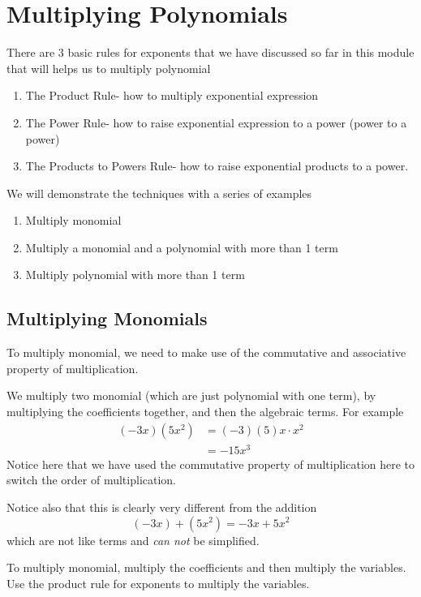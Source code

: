 \section{Multiplying Polynomials}
%
There are 3 basic rules for exponents that we have discussed so far in this module that will 
helps us to multiply polynomial
\begin{enumerate}
	\item The Product Rule- how to multiply exponential expression
	\item The Power Rule- how to raise exponential expression to a power (power to a power)
	\item The Products to Powers Rule- how to raise exponential products to a power.
\end{enumerate}
We will demonstrate the techniques with a series of examples
\begin{enumerate}
	\item Multiply monomial
	\item Multiply a monomial and a polynomial with more than 1 term
	\item Multiply polynomial with more than 1 term
\end{enumerate}

\subsection{Multiplying Monomials}
To multiply monomial, we need to make use of the commutative and associative property of 
multiplication. 

We multiply two monomial (which are just polynomial with one term), by multiplying the coefficients
together, and then the algebraic terms. For example
\begin{align*}
	(-3x)(5x^2) & =		(-3)(5)x\cdot x^2 \\
	            & =		-15 x^3           
\end{align*}
Notice here that we have used the commutative property of multiplication here to switch the 
order of multiplication.

Notice also that this is clearly very different from the addition
\[
	(-3x)+(5x^2)=-3x+5x^2
\] 
which are not like terms and \emph{can not} be simplified.

\begin{myDefinition}
	To multiply monomial, multiply the coefficients and then multiply the variables. Use the product
	rule for exponents to multiply the variables.
\end{myDefinition}

